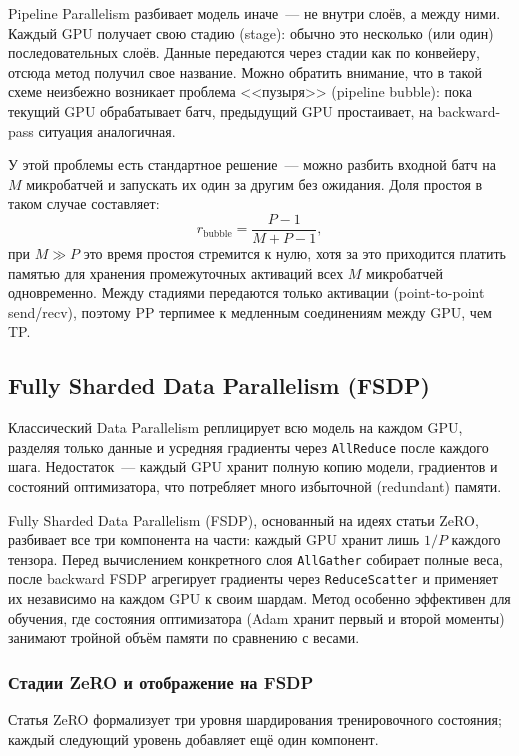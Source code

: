 Pipeline Parallelism\cite{GPipePaper} разбивает модель иначе~--- не
внутри слоёв, а между ними. Каждый GPU получает свою стадию (stage):
обычно это несколько (или один) последовательных слоёв. Данные передаются через стадии как по
конвейеру, отсюда метод получил свое название. 
Можно обратить внимание, что в такой схеме неизбежно возникает проблема <<пузыря>> (pipeline bubble): пока
текущий GPU обрабатывает батч, предыдущий GPU простаивает,
на backward-pass ситуация аналогичная.

У этой проблемы есть стандартное решение~--- можно разбить входной батч на $M$ микробатчей
и запускать их один за другим без ожидания. Доля простоя в таком случае составляет:
$$r_{\text{bubble}} = \frac{P - 1}{M + P - 1},$$
при $M \gg P$ это время простоя стремится к нулю, хотя за это приходится
платить памятью для хранения промежуточных активаций всех $M$ микробатчей одновременно.
Между стадиями передаются только активации
(point-to-point send/recv), поэтому PP терпимее к медленным соединениям между GPU, чем TP.

\subsection{Fully Sharded Data Parallelism (FSDP)}

Классический Data Parallelism реплицирует всю модель на каждом GPU,
разделяя только данные и усредняя градиенты через \texttt{AllReduce}
после каждого шага. Недостаток~--- каждый GPU хранит полную копию
модели, градиентов и состояний оптимизатора, что потребляет много избыточной (redundant) памяти.

Fully Sharded Data Parallelism (FSDP), основанный на идеях статьи
ZeRO\cite{ZeROPaper}, разбивает все три компонента на части: каждый GPU хранит
лишь $1/P$ каждого тензора.
Перед вычислением конкретного слоя \texttt{AllGather} собирает
полные веса, после backward FSDP агрегирует градиенты через \texttt{ReduceScatter}
и применяет их независимо на каждом GPU к своим шардам.
Метод особенно эффективен для обучения, где состояния оптимизатора
(Adam хранит первый и второй моменты) занимают тройной объём памяти
по сравнению с весами.

\subsubsection{Стадии ZeRO и отображение на FSDP}

Статья ZeRO\cite{ZeROPaper} формализует три уровня шардирования
тренировочного состояния; каждый следующий уровень добавляет
ещё один компонент.

